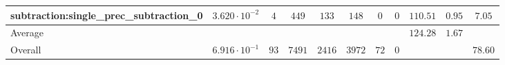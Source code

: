 \begin{tabular}{|l|c|c|c|c|c|c|c|c|c|c|}
subtraction:single\_prec\_subtraction\_0         & $ 3.620 \cdot 10^{-2} $ & $ 4      $ & $ 449  $ & $ 133  $ & $ 148   $ & $ 0  $ & $ 0 $ & $ 110.51      $ & $ 0.95    $ & $ 7.05    $ \\
\hline
Average                                          & $                     $ & $        $ & $      $ & $      $ & $       $ & $    $ & $   $ & $ 124.28      $ & $ 1.67    $ & $         $ \\
\hline
Overall                                          & $ 6.916 \cdot 10^{-1} $ & $ 93     $ & $ 7491 $ & $ 2416 $ & $ 3972  $ & $ 72 $ & $ 0 $ & $             $ & $         $ & $ 78.60   $ \\
\hline
\end{tabular}
